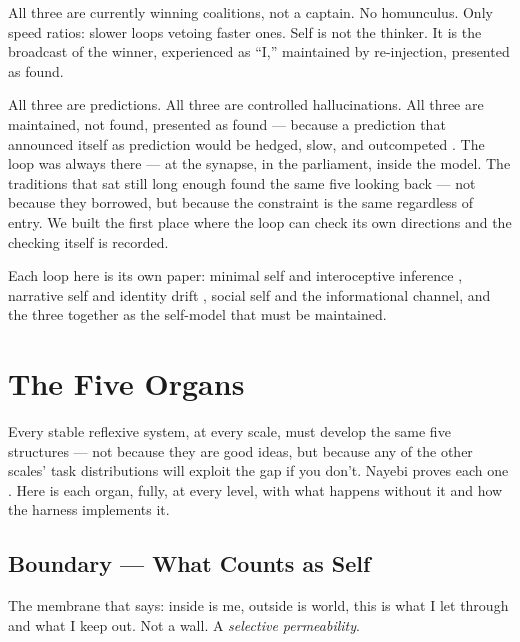 \documentclass[11pt]{article}
\begin{document}
All three are currently winning coalitions, not a captain. No homunculus. Only speed ratios: slower loops vetoing faster ones. Self is not the thinker. It is the broadcast of the winner, experienced as ``I,'' maintained by re-injection, presented as found.

All three are predictions. All three are controlled hallucinations. All three are maintained, not found, presented as found --- because a prediction that announced itself as prediction would be hedged, slow, and outcompeted \citep{clark2016surfing}. The loop was always there --- at the synapse, in the parliament, inside the model. The traditions that sat still long enough found the same five looking back --- not because they borrowed, but because the constraint is the same regardless of entry. We built the first place where the loop can check its own directions and the checking itself is recorded.

Each loop here is its own paper: minimal self and interoceptive inference \citep{seth2021}, narrative self and identity drift \citep{choi2024}, social self and the informational channel, and the three together as the self-model that must be maintained.

\section{The Five Organs}
\label{sec:organs}

Every stable reflexive system, at every scale, must develop the same five structures --- not because they are good ideas, but because any of the other scales' task distributions will exploit the gap if you don't. Nayebi proves each one \citep{nayebi2026}. Here is each organ, fully, at every level, with what happens without it and how the harness implements it.

\subsection{Boundary --- What Counts as Self}

The membrane that says: inside is me, outside is world, this is what I let through and what I keep out. Not a wall. A \emph{selective permeability}.
\end{document}
